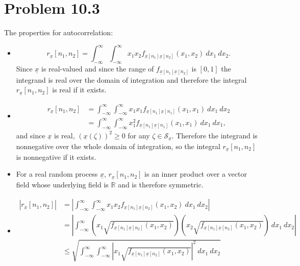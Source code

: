 \documentclass{article}
\begin{document}
\section*{Problem 10.3}
The properties for autocorrelation:
\begin{itemize}
  \item{
    $$
    r_{\underline{x}}[n_1, n_2] 
      = \int_{-\infty}^{\infty} \int_{-\infty}^{\infty}
        x_1 x_2 f_{\underline{x}[n_1]\underline{x}[n_2]}(x_1,x_2) 
        ~dx_1 ~dx_2.
    $$
    Since $\underline{x}$ is real-valued and since the range of
    $f_{\underline{x}[n_1]\underline{x}[n_2]}$ is $[0,1]$ the integrand is 
    real over the domain of integration and therefore the integral 
    $r_{\underline{x}}[n_1, n_2]$ is real if it exists.
  }
  \item
  {
  \begin{align*}
  r_{\underline{x}}[n_1, n_2] 
    &= \int_{-\infty}^{\infty}\int_{-\infty}^{\infty}
      x_1 x_1 f_{\underline{x}[n_1]\underline{x}[n_1]}(x_1, x_1) 
      ~dx_1 ~dx_2 \\ 
    &= \int_{-\infty}^{\infty}\int_{-\infty}^{\infty}
      x_1^2 f_{\underline{x}[n_1]\underline{x}[n_1]}(x_1, x_1) ~dx_1 ~dx_1,
  \end{align*}
  and since $\underline{x}$ is real, $(\underline{x}(\zeta))^2 \geq 0$ for 
  any $\zeta \in \mathcal{S}_{\underline{x}}$. Therefore the integrand is
  nonnegative over the whole domain of integration, so the integral 
  $r_{\underline{x}}[n_1, n_2]$ is 
  nonnegative if it exists.
  }
  \item
  {For a real random process $\underline{x}$, 
   $r_{\underline{x}}[n_1, n_2]$ is an inner product over a vector field 
   whose underlying field is $\mathbb{R}$ and is therefore symmetric.
  }
  \item{
  \begin{align*}
  |r_{\underline{x}}[n_1, n_2]| &= 
    \left|\int_{-\infty}^{\infty} \int_{-\infty}^{\infty}
      x_1 x_2 f_{\underline{x}[n_1] \underline{x}[n_2]}(x_1, x_2) 
       ~dx_1 ~dx_2 \right| \\ 
   &= \left|\int_{-\infty}^{\infty} 
      (x_1 \sqrt{f_{\underline{x}[n_1] \underline{x}[n_2]}(x_1, x_2)})
      (x_2 \sqrt{f_{\underline{x}[n_1] \underline{x}[n_2]}(x_1, x_2)}) 
      ~dx_1 ~dx_2\right|\\
   &\leq 
    \sqrt{\int_{-\infty}^{\infty}\int_{-\infty}^{\infty} 
    \left|x_1 
          \sqrt{f_{\underline{x}[n_1] \underline{x}[n_2]}(x_1, x_2)}
    \right|^2 
     ~dx_1 ~dx_2} \\

\end{align*}}
\end{itemize}
\end{document}
